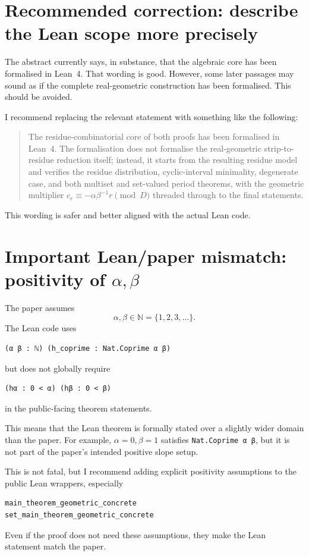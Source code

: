 \documentclass[11pt]{article}
\begin{document}
\section{Recommended correction: describe the Lean scope more precisely}

The abstract currently says, in substance, that the algebraic core has been
formalised in Lean~4.  That wording is good.  However, some later passages may
sound as if the complete real-geometric construction has been formalised.
This should be avoided.

I recommend replacing the relevant statement with something like the following:

\begin{quote}
The residue-combinatorial core of both proofs has been formalised in Lean~4.
The formalisation does not formalise the real-geometric strip-to-residue
reduction itself; instead, it starts from the resulting residue model and
verifies the residue distribution, cyclic-interval minimality, degenerate case,
and both multiset and set-valued period theorems, with the geometric multiplier
\(c_r\equiv -\alpha\beta^{-1}r\pmod D\) threaded through to the final
statements.
\end{quote}

This wording is safer and better aligned with the actual Lean code.

\section{Important Lean/paper mismatch: positivity of \texorpdfstring{\(\alpha,\beta\)}{alpha,beta}}

The paper assumes
\[
\alpha,\beta\in\mathbb N=\{1,2,3,\ldots\}.
\]
The Lean code uses
\begin{lstlisting}[language=Lean]
(α β : ℕ) (h_coprime : Nat.Coprime α β)
\end{lstlisting}
but does not globally require
\begin{lstlisting}[language=Lean]
(hα : 0 < α) (hβ : 0 < β)
\end{lstlisting}
in the public-facing theorem statements.

This means that the Lean theorem is formally stated over a slightly wider
domain than the paper.  For example, \(\alpha=0,\beta=1\) satisfies
\texttt{Nat.Coprime α β}, but it is not part of the paper's intended positive
slope setup.

This is not fatal, but I recommend adding explicit positivity assumptions to
the public Lean wrappers, especially
\begin{lstlisting}[language=Lean]
main_theorem_geometric_concrete
set_main_theorem_geometric_concrete
\end{lstlisting}
Even if the proof does not need these assumptions, they make the Lean statement
match the paper.
\end{document}
